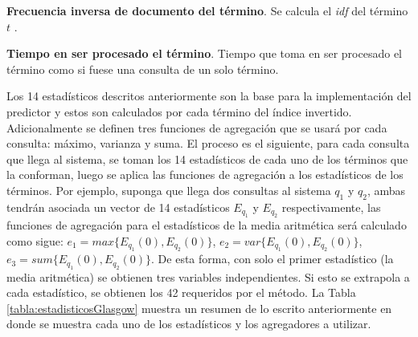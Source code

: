 \begin{list}{}{}
	\item \textbf{Frecuencia inversa de documento del término}. Se calcula el \textit{idf} del término $t$ \citep{Baeza-Yates:2011}.
	
	\item \textbf{Tiempo en ser procesado el término}. Tiempo que toma en ser procesado el término como si fuese una consulta de un solo término.

\end{list}

Los 14 estadísticos descritos anteriormente son la base para la implementación del predictor y estos son calculados por cada término del índice invertido. Adicionalmente se definen tres funciones de agregación que se usará por cada consulta: máximo, varianza y suma. El proceso es el siguiente, para cada consulta que llega al sistema, se toman los 14 estadísticos de cada uno de los términos que la conforman, luego se aplica las funciones de agregación a los estadísticos de los términos. Por ejemplo, suponga que llega dos consultas al sistema $q_1$ y $q_2$, ambas tendrán asociada un vector de 14 estadísticos $E_{q_1}$ y $E_{q_2}$ respectivamente, las funciones de agregación para el estadísticos de la media aritmética será calculado como sigue: $e_1 = max\{E_{q_1}(0), E_{q_2}(0)\}$, $e_2 = var\{E_{q_1}(0), E_{q_2}(0)\}$, $e_3 = sum\{E_{q_1}(0), E_{q_2}(0)\}$. De esta forma, con solo el primer estadístico (la media aritmética) se obtienen tres variables independientes. Si esto se extrapola a cada estadístico, se obtienen los 42 requeridos por el método. 
La Tabla \ref{tabla:estadisticosGlasgow} muestra un resumen de lo escrito anteriormente en donde se muestra cada uno de los estadísticos y los agregadores a utilizar. 

